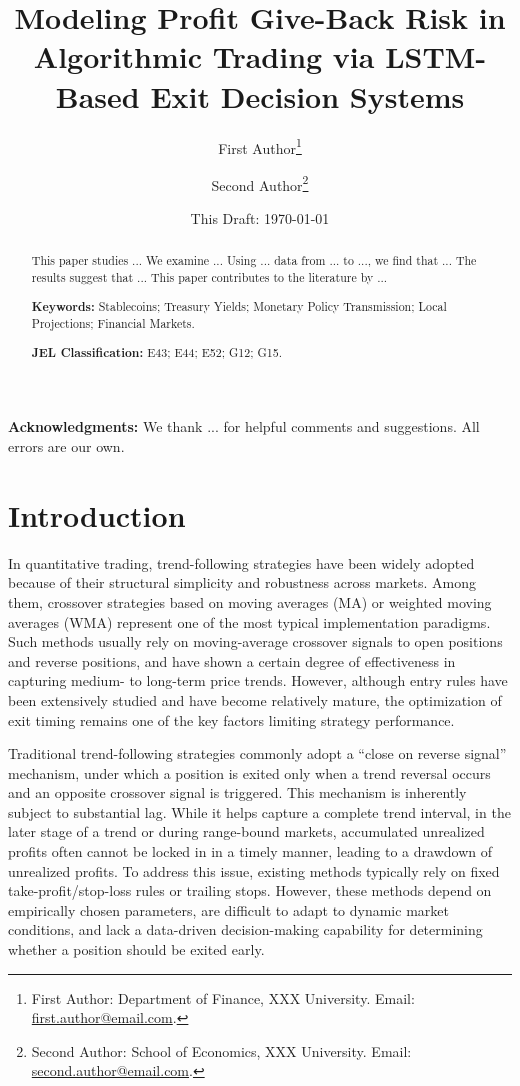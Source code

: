 \documentclass[12pt]{article}
\title{\textbf{Modeling Profit Give-Back Risk in Algorithmic Trading via LSTM-Based Exit Decision Systems}}
\author{
First Author\thanks{
First Author: Department of Finance, XXX University.
Email: \href{mailto:first.author@email.com}{first.author@email.com}.
}
\and
Second Author\thanks{
Second Author: School of Economics, XXX University.
Email: \href{mailto:second.author@email.com}{second.author@email.com}.
}
}
\date{
This Draft: \today
}
\begin{document}
\maketitle

\begin{abstract}
\noindent
This paper studies ...
We examine ...
Using ... data from ... to ..., we find that ...
The results suggest that ...
This paper contributes to the literature by ...

\vspace{0.5em}
\noindent
\textbf{Keywords:} Stablecoins; Treasury Yields; Monetary Policy Transmission; Local Projections; Financial Markets.

\vspace{0.5em}
\noindent
\textbf{JEL Classification:} E43; E44; E52; G12; G15.
\end{abstract}

\vspace{1em}

\noindent
\textbf{Acknowledgments:}
We thank ... for helpful comments and suggestions. All errors are our own.

\newpage

\section{Introduction}\label{sec:introduction}

In quantitative trading, trend-following strategies have been widely adopted because of their 
structural simplicity and robustness across markets. Among them, crossover strategies based on 
moving averages (MA) or weighted moving averages (WMA) represent one of the most typical 
implementation paradigms. Such methods usually rely on moving-average crossover signals to open 
positions and reverse positions, and have shown a certain degree of effectiveness in capturing 
medium- to long-term price trends. However, although entry rules have been extensively studied 
and have become relatively mature, the optimization of exit timing remains one of the key 
factors limiting strategy performance.

Traditional trend-following strategies commonly adopt a “close on reverse signal” mechanism, 
under which a position is exited only when a trend reversal occurs and an opposite crossover 
signal is triggered. This mechanism is inherently subject to substantial lag. While it helps 
capture a complete trend interval, in the later stage of a trend or during range-bound markets, 
accumulated unrealized profits often cannot be locked in in a timely manner, leading to a 
drawdown of unrealized profits. To address this issue, existing methods typically rely on fixed 
take-profit/stop-loss rules or trailing stops. However, these methods depend on empirically 
chosen parameters, are difficult to adapt to dynamic market conditions, and lack a data-driven 
decision-making capability for determining whether a position should be exited early.
\end{document}

